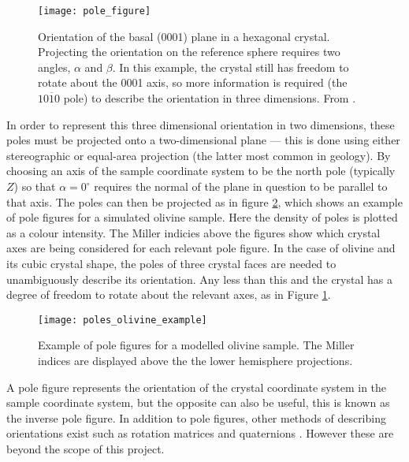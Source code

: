 \documentclass[a4paper,12pt]{report}
\numberwithin{equation}{chapter}
\begin{document}
\begin{figure}[h!]
  \centering
    \texttt{[image: pole\_figure]}
  \caption[Pole figure visualisation]{Orientation of the basal (0001) plane in a hexagonal crystal. Projecting the orientation on the reference sphere requires two angles, $\alpha$ and $\beta$. In this example, the crystal still has freedom to rotate about the 0001 axis, so more information is required (the $\mathit{10\overline{1}0}$ pole) to describe the orientation in three dimensions. From \cite{Randle2000}.}
  \label{fig:spherical_orientation}
\end{figure}




In order to represent this three dimensional orientation in two dimensions, these poles must be projected onto a two-dimensional plane --- this is done using either stereographic or equal-area projection (the latter most common in geology). By choosing an axis of the sample coordinate system to be the north pole (typically $Z$) so that $\alpha = 0^\circ$ requires the normal of the plane in question to be parallel to that axis. The poles can then be projected as in figure \ref{fig:pole_olivine_example}, which shows an example of pole figures for a simulated olivine sample. Here the density of poles is plotted as a colour intensity. The Miller indicies above the figures show which crystal axes are being considered for each relevant pole figure. In the case of olivine and its cubic crystal shape, the poles of three crystal faces are needed to unambiguously describe its orientation. Any less than this and the crystal has a degree of freedom to rotate about the relevant axes, as in Figure \ref{fig:spherical_orientation}. 




\begin{figure}[h]
  \centering
    \texttt{[image: poles\_olivine\_example]}
  \caption[Pole figure olivine example]{Example of pole figures for a modelled olivine sample. The Miller indices are displayed above the the lower hemisphere projections.}
  \label{fig:pole_olivine_example}
\end{figure}




A pole figure represents the orientation of the crystal coordinate system in the sample coordinate system, but the opposite can also be useful, this is known as the inverse pole figure. In addition to pole figures, other methods of describing orientations exist such as rotation matrices \citep{bunge1982texture,Randle2000} and quaternions \citep{Quaternions}. However these are beyond the scope of this project. 
\end{document}
